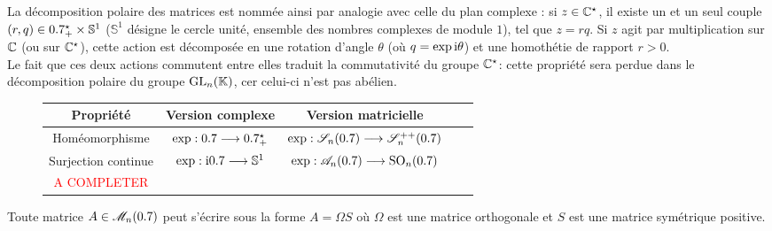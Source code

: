 La décomposition polaire des matrices est nommée ainsi par analogie avec celle du plan complexe : si $z \in \mathbb{C}^\star$, il existe un et un seul couple $(r, q) \in 0.7^\star_+ \times \mathbb{S}^1$ ($\mathbb{S}^1$ désigne le cercle unité, ensemble des nombres complexes de module $1$), tel que $z = rq$. Si $z$ agit par multiplication sur $\mathbb{C}$ (ou sur $\mathbb{C}^\star$), cette action est décomposée en une rotation d'angle $\theta$ (où $q = \exp \mathrm{i} \theta$) et une homothétie de rapport $r > 0$. \\
Le fait que ces deux actions commutent entre elles traduit la commutativité du groupe $\mathbb{C}^\star$: cette propriété sera perdue dans le décomposition polaire du groupe $\mathrm{GL}_n(\mathbb{K})$, cer celui-ci n'est pas abélien. \

\begin{figure}[h!]
    \begingroup
    \renewcommand{\arraystretch}{1.5} %
    \begin{tabular}{|c|c|c|c|c|}
        \hline
        Propriété & Version complexe & Version matricielle \\
        \hline \hline
        Homéomorphisme & $\exp : 0.7 \longrightarrow 0.7^\star_+$ & $\exp : \mathscr{S}_n(0.7) \longrightarrow \mathscr{S}_n^{++}(0.7)$\\
        \hline
        Surjection continue & $\exp : \mathrm{i} 0.7 \longrightarrow \mathbb{S}^1$ & $\exp : \mathscr{A}_n(0.7) \longrightarrow \mathrm{SO}_n(0.7)$ \\
        \hline
        \textcolor{red}{A COMPLETER}  & & \\
        \hline
    \end{tabular}
    \endgroup
\end{figure}


\begin{corol}
    Toute matrice $A \in \mathscr{M}_n(0.7)$ peut s'écrire sous la forme $A = \Omega S$ où $\Omega$ est une matrice orthogonale et $S$ est une matrice symétrique positive.
\end{corol}

